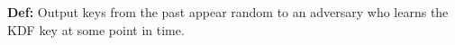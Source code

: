 \textbf{Def:} Output keys from the past appear random to an adversary who learns the KDF key at some point in time.
